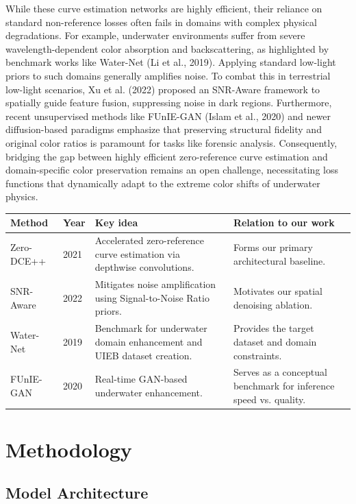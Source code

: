 \documentclass[11pt, letterpaper]{article}
\begin{document}
While these curve estimation networks are highly efficient, their reliance on standard non-reference losses often fails in domains with complex physical degradations. For example, underwater environments suffer from severe wavelength-dependent color absorption and backscattering, as highlighted by benchmark works like Water-Net (Li et al., 2019). Applying standard low-light priors to such domains generally amplifies noise. To combat this in terrestrial low-light scenarios, Xu et al. (2022) proposed an SNR-Aware framework to spatially guide feature fusion, suppressing noise in dark regions. Furthermore, recent unsupervised methods like FUnIE-GAN (Islam et al., 2020) and newer diffusion-based paradigms emphasize that preserving structural fidelity and original color ratios is paramount for tasks like forensic analysis. Consequently, bridging the gap between highly efficient zero-reference curve estimation and domain-specific color preservation remains an open challenge, necessitating loss functions that dynamically adapt to the extreme color shifts of underwater physics.

\begin{center}
\small
\begin{tabular}{lp{1.2cm}p{5.8cm}p{5.5cm}}
\toprule
\textbf{Method} & \textbf{Year} & \textbf{Key idea} & \textbf{Relation to our work} \\
\midrule
Zero-DCE++ & 2021 & Accelerated zero-reference curve estimation via depthwise convolutions. & Forms our primary architectural baseline. \\
\addlinespace
SNR-Aware & 2022 & Mitigates noise amplification using Signal-to-Noise Ratio priors. & Motivates our spatial denoising ablation. \\
\addlinespace
Water-Net & 2019 & Benchmark for underwater domain enhancement and UIEB dataset creation. & Provides the target dataset and domain constraints. \\
\addlinespace
FUnIE-GAN & 2020 & Real-time GAN-based underwater enhancement. & Serves as a conceptual benchmark for inference speed vs. quality. \\
\bottomrule
\end{tabular}
\end{center}

\section{Methodology}

\subsection{Model Architecture}
\end{document}
